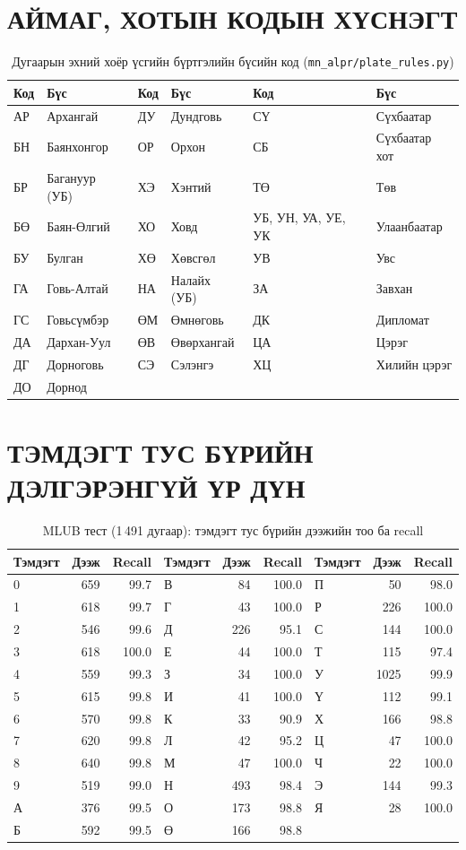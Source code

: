 \chapter{АЙМАГ, ХОТЫН КОДЫН ХҮСНЭГТ}\label{app:regions}
\begin{table}[H]\centering\caption{Дугаарын эхний хоёр үсгийн бүртгэлийн бүсийн код (\texttt{mn\_alpr/plate\_rules.py})}\small
\begin{tabular}{ll|ll|ll}\toprule
Код & Бүс & Код & Бүс & Код & Бүс\\\midrule
АР & Архангай & ДУ & Дундговь & СҮ & Сүхбаатар\\
БН & Баянхонгор & ОР & Орхон & СБ & Сүхбаатар хот\\
БР & Багануур (УБ) & ХЭ & Хэнтий & ТӨ & Төв\\
БӨ & Баян-Өлгий & ХО & Ховд & УБ, УН, УА, УЕ, УК & Улаанбаатар\\
БУ & Булган & ХӨ & Хөвсгөл & УВ & Увс\\
ГА & Говь-Алтай & НА & Налайх (УБ) & ЗА & Завхан\\
ГС & Говьсүмбэр & ӨМ & Өмнөговь & ДК & Дипломат\\
ДА & Дархан-Уул & ӨВ & Өвөрхангай & ЦА & Цэрэг\\
ДГ & Дорноговь & СЭ & Сэлэнгэ & ХЦ & Хилийн цэрэг\\
ДО & Дорнод & & & &\\\bottomrule
\end{tabular}\end{table}

\chapter{ТЭМДЭГТ ТУС БҮРИЙН ДЭЛГЭРЭНГҮЙ ҮР ДҮН}\label{app:perchar}
\begin{table}[H]\centering\caption{MLUB тест (1\,491 дугаар): тэмдэгт тус бүрийн дээжийн тоо ба recall}\small
\begin{tabular}{lrr|lrr|lrr}\toprule
Тэмдэгт & Дээж & Recall & Тэмдэгт & Дээж & Recall & Тэмдэгт & Дээж & Recall\\\midrule
0 & 659 & 99.7 & В & 84 & 100.0 & П & 50 & 98.0\\
1 & 618 & 99.7 & Г & 43 & 100.0 & Р & 226 & 100.0\\
2 & 546 & 99.6 & Д & 226 & 95.1 & С & 144 & 100.0\\
3 & 618 & 100.0 & Е & 44 & 100.0 & Т & 115 & 97.4\\
4 & 559 & 99.3 & З & 34 & 100.0 & У & 1025 & 99.9\\
5 & 615 & 99.8 & И & 41 & 100.0 & Ү & 112 & 99.1\\
6 & 570 & 99.8 & К & 33 & 90.9 & Х & 166 & 98.8\\
7 & 620 & 99.8 & Л & 42 & 95.2 & Ц & 47 & 100.0\\
8 & 640 & 99.8 & М & 47 & 100.0 & Ч & 22 & 100.0\\
9 & 519 & 99.0 & Н & 493 & 98.4 & Э & 144 & 99.3\\
А & 376 & 99.5 & О & 173 & 98.8 & Я & 28 & 100.0\\
Б & 592 & 99.5 & Ө & 166 & 98.8 &  & & \\
\bottomrule\end{tabular}\end{table}

